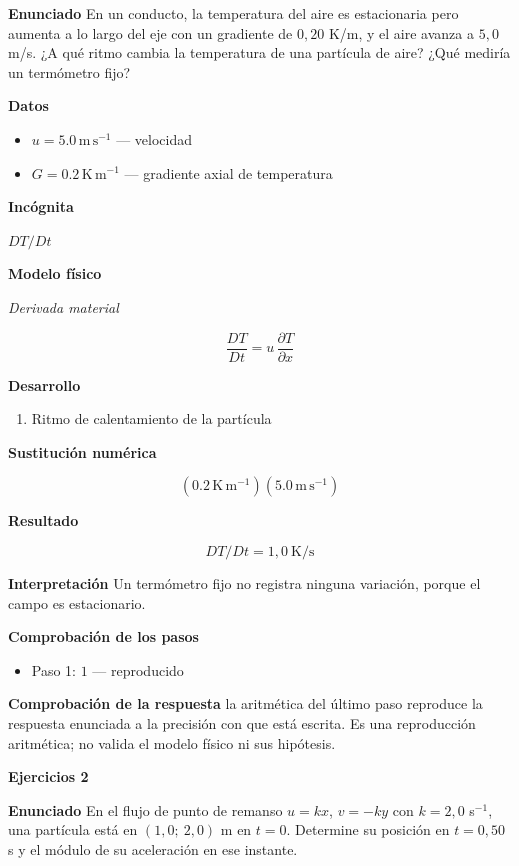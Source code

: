 \documentclass[10pt,openany]{book}
\begin{document}
\noindent\textbf{Enunciado}
En un conducto, la temperatura del aire es estacionaria pero aumenta a lo largo del eje con un gradiente de \(0{,}20\) K/m, y el aire avanza a \(5{,}0\) m/s. ¿A qué ritmo cambia la temperatura de una partícula de aire? ¿Qué mediría un termómetro fijo?

\noindent\textbf{Datos}
\begin{itemize}
\item $u = 5.0\,\mathrm{m}\,\mathrm{s}^{-1}$ — velocidad
\item $G = 0.2\,\mathrm{K}\,\mathrm{m}^{-1}$ — gradiente axial de temperatura
\end{itemize}

\noindent\textbf{Incógnita}

\(DT/Dt\)

\noindent\textbf{Modelo físico}

\noindent\textit{Derivada material}

\[
\frac{DT}{Dt} = u\,\frac{\partial T}{\partial x}
\]

\noindent\textbf{Desarrollo}
\begin{enumerate}
\item
Ritmo de calentamiento de la partícula
\end{enumerate}

\noindent\textbf{Sustitución numérica}

\[
\left(0.2\,\mathrm{K}\,\mathrm{m}^{-1}\right) \left(5.0\,\mathrm{m}\,\mathrm{s}^{-1}\right)
\]

\noindent\textbf{Resultado}

\[
DT/Dt = 1{,}0\ \mathrm{K/s}
\]

\noindent\textbf{Interpretación}
Un termómetro fijo no registra ninguna variación, porque el campo es estacionario.

\noindent\textbf{Comprobación de los pasos}
\begin{itemize}
\item Paso 1: $1$ — reproducido
\end{itemize}

\noindent\textbf{Comprobación de la respuesta} la aritmética del último paso reproduce la respuesta enunciada a la precisión con que está escrita. Es una reproducción aritmética; no valida el modelo físico ni sus hipótesis.

\noindent\textbf{Ejercicios 2}

\noindent\textbf{Enunciado}
En el flujo de punto de remanso \(u = kx\), \(v = -ky\) con \(k = 2{,}0\) s\(^{-1}\), una partícula está en \((1{,}0;\ 2{,}0)\) m en \(t = 0\). Determine su posición en \(t = 0{,}50\) s y el módulo de su aceleración en ese instante.
\end{document}

